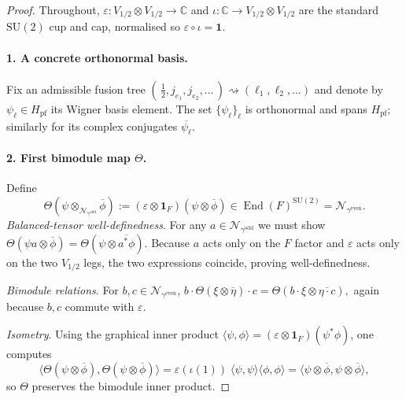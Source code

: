 \documentclass[11pt]{article}
\begin{document}
\begin{proof}
  Throughout, $\varepsilon:V_{1/2}\!\otimes V_{1/2}\!\to\!\mathbb C$ and
  $\iota:\mathbb C\!\to\!V_{1/2}\!\otimes V_{1/2}$ are the standard
  $\mathrm{SU}(2)$ cup and cap, normalised so $\varepsilon\!\circ\!\iota=\mathbf1$.

  \paragraph{1. A concrete orthonormal basis.}
  Fix an admissible fusion tree
  \(
    (\,\tfrac12,j_{e_1},j_{e_2},\dots\,)\rightsquigarrow
    (\ell_1,\ell_2,\dots)
  \)
  and denote by
  $\psi_{\boldsymbol\ell}\in H_{\mathrm{pf}}$ its Wigner basis element.
  The set
  \(
    \{\psi_{\boldsymbol\ell}\}_{\boldsymbol\ell}
  \)
  is orthonormal and spans $H_{\mathrm{pf}}$; similarly for its complex
  conjugates $\overline{\psi_{\boldsymbol\ell}}$.

  \paragraph{2. First bimodule map $\Theta$.}
  Define
  \[
    \Theta(\psi\otimes_{\mathcal N_{\gamma^{\mathrm{odd}}}}\overline\phi)
    :=(\varepsilon\!\otimes\!\mathbf1_F)(\psi\otimes\overline\phi)
    \in\operatorname{End}(F)^{\mathrm{SU}(2)}
    =\mathcal N_{\gamma^{\mathrm{even}}}.
  \]
  \emph{Balanced-tensor well-definedness}.
  For any $a\in\mathcal N_{\gamma^{\mathrm{odd}}}$
  we must show
  \(
    \Theta(\psi a\otimes\overline\phi)
    =\Theta(\psi\otimes\overline{a^{*}\phi}).
  \)
  Because $a$ acts only on the $F$ factor and $\varepsilon$ acts only on the
  two $V_{1/2}$ legs, the two expressions coincide, proving
  well-definedness.

  \emph{Bimodule relations}.
  For $b,c\in\mathcal N_{\gamma^{\mathrm{even}}}$,
  \(
    b\cdot\Theta(\xi\otimes\overline\eta)\cdot c
    =\Theta(b\cdot\xi\otimes\overline{\eta\cdot c}),
  \)
  again because $b,c$ commute with $\varepsilon$.

  \emph{Isometry}.
  Using the graphical inner product
  $\langle\psi,\phi\rangle
  =(\varepsilon\!\otimes\!\mathbf1_F)(\psi^{*}\phi)$,
  one computes
  \[
    \langle\Theta(\psi\otimes\overline\phi),
    \Theta(\psi\otimes\overline\phi)\rangle
    =\varepsilon(\iota(1))\;
    \langle\psi,\psi\rangle\langle\phi,\phi\rangle
    =\langle\psi\otimes\overline\phi,\psi\otimes\overline\phi\rangle,
  \]
  so $\Theta$ preserves the bimodule inner product.


\end{proof}
\end{document}
